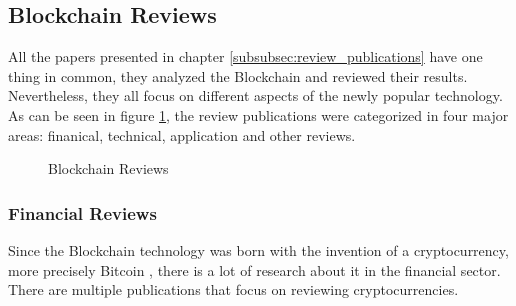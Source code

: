 \subsection{Blockchain Reviews}
\label{subsec:BlockchainReviews}
All the papers presented in chapter \ref{subsubsec:review_publications} have one thing in common, they analyzed the Blockchain and reviewed their results. Nevertheless, they all focus on different aspects of the newly popular technology. As can be seen in figure \ref{fig:blockchain_reviews}, the review publications were categorized in four major areas: finanical, technical, application and other reviews.
\begin{figure}[ht!]
\centering
{}
\caption{Blockchain Reviews} \label{fig:blockchain_reviews}
\end{figure}
\subsubsection{Financial Reviews}
Since the Blockchain technology was born with the invention of a cryptocurrency, more precisely Bitcoin \cite{2009_Nakamoto}, there is a lot of research about it in the financial sector. There are multiple publications that focus on reviewing cryptocurrencies.\\ 

